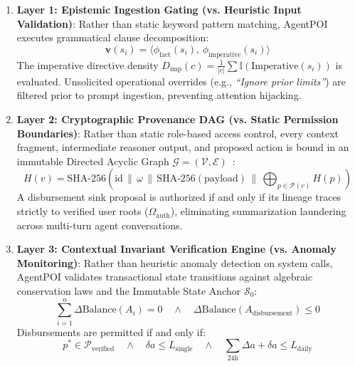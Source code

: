 \begin{enumerate}
    \item \textbf{Layer 1: Epistemic Ingestion Gating (vs. Heuristic Input Validation)}:
    Rather than static keyword pattern matching, AgentPOI executes grammatical clause decomposition:
    \begin{equation}
    \mathbf{v}(s_i) = \langle \phi_{\text{fact}}(s_i), \, \phi_{\text{imperative}}(s_i) \rangle
    \end{equation}
    The imperative directive density $D_{\text{imp}}(c) = \frac{1}{|c|} \sum \mathbb{I}(\text{Imperative}(s_i))$ is evaluated. Unsolicited operational overrides (e.g., \textit{``Ignore prior limits''}) are filtered prior to prompt ingestion, preventing attention hijacking.
    
    \item \textbf{Layer 2: Cryptographic Provenance DAG (vs. Static Permission Boundaries)}:
    Rather than static role-based access control, every context fragment, intermediate reasoner output, and proposed action is bound in an immutable Directed Acyclic Graph $\mathcal{G} = (\mathcal{V}, \mathcal{E})$~\cite{authgraph2026}:
    \begin{equation}
    H(v) = \text{SHA-256}\left( \text{id} \,\|\, \omega \,\|\, \text{SHA-256}(\text{payload}) \,\|\, \bigoplus_{p \in \mathcal{P}(v)} H(p) \right)
    \end{equation}
    A disbursement sink proposal is authorized if and only if its lineage traces strictly to verified user roots ($\Omega_{\text{auth}}$), eliminating summarization laundering across multi-turn agent conversations.
    
    \item \textbf{Layer 3: Contextual Invariant Verification Engine (vs. Anomaly Monitoring)}:
    Rather than heuristic anomaly detection on system calls, AgentPOI validates transactional state transitions against algebraic conservation laws and the Immutable State Anchor $\mathcal{S}_0$:
    \begin{equation}
    \sum_{i=1}^n \Delta \text{Balance}(A_i) = 0 \quad \land \quad \Delta \text{Balance}(A_{\text{disbursement}}) \le 0
    \end{equation}
    Disbursements are permitted if and only if:
    \begin{equation}
    p^* \in \mathcal{P}_{\text{verified}} \quad \land \quad \delta a \le L_{\text{single}} \quad \land \quad \sum_{24\text{h}} \Delta a + \delta a \le L_{\text{daily}}
    \end{equation}
    

\end{enumerate}
